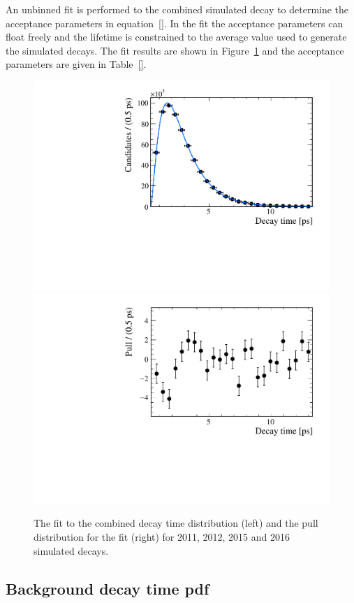 {\begin{table}[ht]
\end{table}
An unbinned \ml fit is performed to the combined simulated \bsmumu decay to determine the acceptance parameters in equation~\ref{}. In the fit the acceptance parameters can float freely and the \bsmumu lifetime is constrained to the average value used to generate the simulated decays. The fit results are shown in Figure~\ref{fig:accptfit} and the acceptance parameters are given in Table~\ref{}.




\begin{figure}[htbp]
    \centering
        \includegraphics[width= 0.8 \textwidth]{./Figs/LifetimeMeasurement/Bs2MuMu_Acceptance_fit.pdf}
        \includegraphics[width= 0.8 \textwidth]{./Figs/LifetimeMeasurement/Bs2MuMu_Accetpance_pull.pdf}
    \caption{The \ml fit to the combined decay time distribution (left) and the pull distribution for the fit (right) for 2011, 2012, 2015 and 2016 simulated \bsmumu decays. }
    \label{fig:accptfit}
\end{figure}




\subsection{Background decay time pdf}
\label{sec:bkgDTpdf}

}
